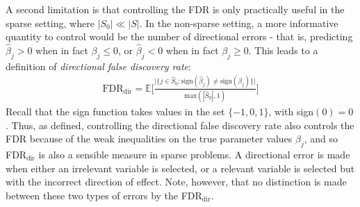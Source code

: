 \documentclass[]{scrartcl}
\newcommand{\1}[1]{\mathbbm{1}_{\left\{#1\right\}}}
\begin{document}
\noindent
A second limitation is that controlling the FDR is only practically useful in the sparse setting, where $|S_{0}| \ll |S|$. In the non-sparse setting, a more informative quantity to control would be the number of directional errors - that is, predicting $\widehat{\beta}_{j} > 0$ when in fact $\beta_{j} \leq 0$, or $\widehat{\beta}_{j} < 0$ when in fact $\beta_{j} \geq 0$. This leads to a definition of \textit{directional false discovery rate}:
\begin{align}\label{eq:4}
\text{FDR}_{\text{dir}} = \mathbb{E}\Bigg[\frac{\big|\{j \in \widehat{S}_{0} : \text{sign}(\widehat{\beta}_{j}) \neq \text{sign}(\beta_{j})\} \big|}{\text{max}(|\widehat{S}_{0}|, 1)} \Bigg]
\end{align}
Recall that the sign function takes values in the set $\{-1, 0, 1\}$, with sign$(0) = 0$. Thus, as defined, controlling the directional false discovery rate also controls the FDR because of the weak inequalities on the true parameter values $\beta_{j}$, and so FDR$_{\text{dir}}$ is also a sensible measure in sparse problems. A directional error is made when either an irrelevant variable is selected, or a relevant variable is selected but with the incorrect direction of effect. Note, however, that no distinction is made between these two types of errors by the FDR$_{\text{dir}}$.
\end{document}
